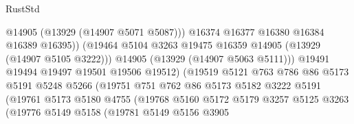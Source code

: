 \begin{lexlean}{RustStd}
\begin{coremodule}
                                          @14905
                                          (@13929 (@14907 @5071 @5087)))
                                        @16374
                                        @16377
                                        @16380
                                        @16384
                                        @16389
                                        @16395))
                                    (@19464
                                      @5104
                                      @3263
                                      @19475
                                      @16359
                                      @14905
                                      (@13929 (@14907 @5105 @3222)))
                                    @14905
                                    (@13929 (@14907 @5063 @5111)))
                                  @19491
                                  @19494
                                  @19497
                                  @19501
                                  @19506
                                  @19512)
                                (@19519
                                  @5121
                                  @763
                                  @786
                                  @86
                                  @5173
                                  @5191
                                  @5248
                                  @5266
                                  (@19751
                                    @751
                                    @762
                                    @86
                                    @5173
                                    @5182
                                    @3222
                                    @5191
                                    (@19761
                                      @5173
                                      @5180
                                      @4755
                                      (@19768
                                        @5160
                                        @5172
                                        @5179
                                        @3257
                                        @5125
                                        @3263
                                        (@19776
                                          @5149
                                          @5158
                                          (@19781
                                            @5149
                                            @5156
                                            @3905

\end{coremodule}
\end{lexlean}
